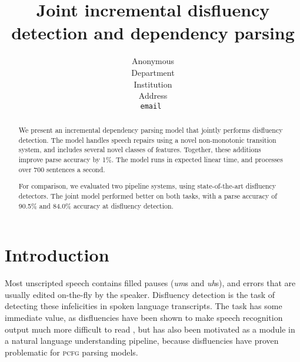 \documentclass[11pt,letterpaper]{article}
\title{Joint incremental disfluency detection and dependency parsing}
\author{
	Anonymous\\
  	Department\\
  	Institution\\
  	Address\\
  {\tt \small email }\\
}
\date{}
\newcommand{\pcfg}{\textsc{pcfg}\xspace}
\begin{document}
\maketitle
\begin{abstract}

We present an incremental dependency parsing model that jointly performs
disfluency detection.  The model handles speech repairs using a novel non-monotonic
transition system, and includes several novel classes of features.  Together, these
additions improve parse accuracy by 1\%.  The model runs in expected linear time,
and processes over 700 sentences a second.

For comparison, we evaluated two pipeline systems, using state-of-the-art disfluency
detectors.  The joint model performed better on both tasks,
with a parse accuracy of 90.5\% and 84.0\% accuracy at disfluency detection.

\end{abstract}

\section{Introduction}

Most unscripted speech contains filled pauses (\emph{um}s and \emph{uh}s), and
errors that are usually edited on-the-fly by the speaker. Disfluency detection
is the task of detecting these infelicities in spoken language transcripts. The
task has some immediate value, as disfluencies have been shown to make speech
recognition output much more difficult to read \citep{jones:03}, but has also
been motivated as a module in a natural language understanding pipeline, because
disfluencies have proven problematic for \pcfg parsing models.


\end{document}
